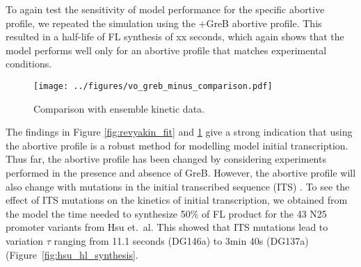 To again test the sensitivity of model performance for the specific abortive
profile, we repeated the simulation using the +GreB abortive profile. This
resulted in a half-life of FL synthesis of xx seconds, which again shows that
the model performs well only for an abortive profile that matches experimental
conditions.

\begin{figure}
    \begin{center}
        \texttt{[image: ../figures/vo\_greb\_minus\_comparison.pdf]}
    \end{center}
    \caption{Comparison with ensemble kinetic data.}
\label{fig:vo_comparison}
\end{figure}

The findings in Figure \ref{fig:revyakin_fit} and \ref{fig:vo_comparison} give
a strong indication that using the abortive profile is a robust method for
modelling model initial transcription. Thus far, the abortive profile has been
changed by considering experiments performed in the presence and absence of
GreB.  However, the abortive profile will also change with mutations in the
initial transcribed sequence (ITS) \cite{hsu_initial_2006}. To see the effect
of ITS mutations on the kinetics of initial transcription, we obtained from
the model the time needed to synthesize 50\% of FL product for the 43 N25
promoter variants from Hsu et.\ al. This showed that ITS mutations lead to
variation $\tau$ ranging from 11.1 seconds (DG146a) to 3min 40s
(DG137a)(Figure~\ref{fig:hsu_hl_synthesis}.




